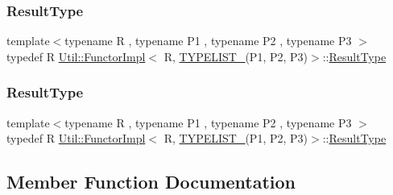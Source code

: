 \subsubsection{\texorpdfstring{ResultType}{ResultType}\hspace{0.1cm}{\footnotesize\ttfamily [2/3]}}
{\footnotesize\ttfamily template$<$typename R , typename P1 , typename P2 , typename P3 $>$ \\
typedef R \mbox{\hyperlink{classUtil_1_1FunctorImpl}{Util\+::\+Functor\+Impl}}$<$ R, \mbox{\hyperlink{adat__devel__install_2include_2adat_2typelist_8h_a0309f68a543c5c0994f9edc0e56dc59f}{T\+Y\+P\+E\+L\+I\+S\+T\+\_}}(P1, P2, P3)$>$\+::\mbox{\hyperlink{structUtil_1_1Private_1_1FunctorImplBase_a5e95fd30fdd89f3c5080b68ab5891bc3}{Result\+Type}}}

\mbox{\label{classUtil_1_1FunctorImpl_3_01R_00_01TYPELIST__3_07P1_00_01P2_00_01P3_08_4_aac45953d9a4169ab320e3832125e5f6b}} 
\subsubsection{\texorpdfstring{ResultType}{ResultType}\hspace{0.1cm}{\footnotesize\ttfamily [3/3]}}
{\footnotesize\ttfamily template$<$typename R , typename P1 , typename P2 , typename P3 $>$ \\
typedef R \mbox{\hyperlink{classUtil_1_1FunctorImpl}{Util\+::\+Functor\+Impl}}$<$ R, \mbox{\hyperlink{adat__devel__install_2include_2adat_2typelist_8h_a0309f68a543c5c0994f9edc0e56dc59f}{T\+Y\+P\+E\+L\+I\+S\+T\+\_}}(P1, P2, P3)$>$\+::\mbox{\hyperlink{structUtil_1_1Private_1_1FunctorImplBase_a5e95fd30fdd89f3c5080b68ab5891bc3}{Result\+Type}}}



\subsection{Member Function Documentation}
\mbox{\label{classUtil_1_1FunctorImpl_3_01R_00_01TYPELIST__3_07P1_00_01P2_00_01P3_08_4_a80ceaa256d42f98c4523dea840906200}} 
